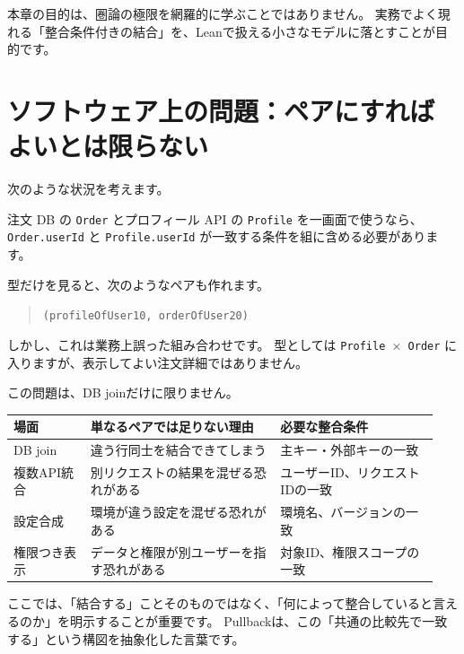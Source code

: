 
本章の目的は、圏論の極限を網羅的に学ぶことではありません。
実務でよく現れる「整合条件付きの結合」を、Leanで扱える小さなモデルに落とすことが目的です。

\section{ソフトウェア上の問題：ペアにすればよいとは限らない}

次のような状況を考えます。

注文 DB の \texttt{Order} とプロフィール API の \texttt{Profile} を一画面で使うなら、
\texttt{Order.userId} と \texttt{Profile.userId} が一致する条件を組に含める必要があります。

型だけを見ると、次のようなペアも作れます。

\begin{quote}
\texttt{(profileOfUser10, orderOfUser20)}
\end{quote}

しかし、これは業務上誤った組み合わせです。
型としては \texttt{Profile \ensuremath{\times} Order} に入りますが、表示してよい注文詳細ではありません。

この問題は、DB joinだけに限りません。

\begin{center}
\small
\setlength{\tabcolsep}{3pt}
\begin{tabular}{@{}p{0.17\linewidth}p{0.42\linewidth}p{0.35\linewidth}@{}}
\toprule
場面 & 単なるペアでは足りない理由 & 必要な整合条件 \\
\midrule
DB join & 違う行同士を結合できてしまう & 主キー・外部キーの一致 \\
複数API統合 & 別リクエストの結果を混ぜる恐れがある & ユーザーID、リクエストIDの一致 \\
設定合成 & 環境が違う設定を混ぜる恐れがある & 環境名、バージョンの一致 \\
権限つき表示 & データと権限が別ユーザーを指す恐れがある & 対象ID、権限スコープの一致 \\
\bottomrule
\end{tabular}
\end{center}

ここでは、「結合する」ことそのものではなく、「何によって整合していると言えるのか」を明示することが重要です。
Pullbackは、この「共通の比較先で一致する」という構図を抽象化した言葉です。

